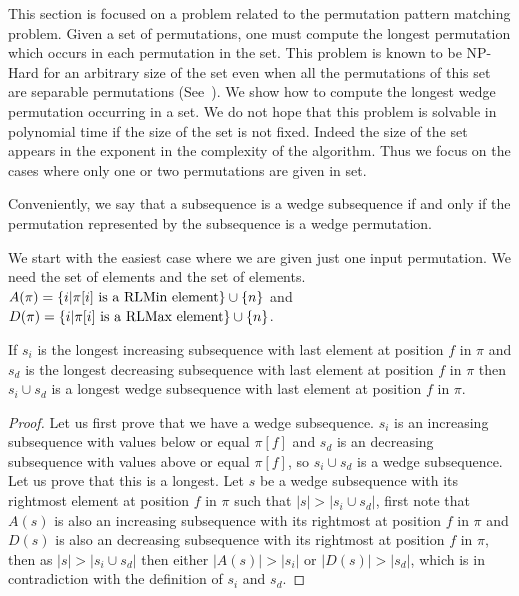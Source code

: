\documentclass[a4paper]{llncs}
\newcommand{\RLMin}{\text{RLMin}\xspace}
\newcommand{\RLMax}{\text{RLMax}\xspace}
\begin{document}
This section is focused on a problem related to the permutation pattern matching problem.
Given a set of permutations, one must compute the longest permutation
which occurs in each permutation in the set.
This problem is known to be NP-Hard for an arbitrary size of the set even
when all the permutations of this set are separable permutations (See~\cite{2007math......2109B}).
We show how to compute the longest wedge permutation
occurring in a set.
We do not hope that this problem is solvable in polynomial time
if the size of the set is not fixed.
Indeed the size of the set appears in the exponent
in the complexity of the algorithm.
Thus we focus on the cases where only one or two permutations are given in set.

Conveniently, we say that a subsequence is
a wedge subsequence if and only if the permutation represented by the subsequence
is a wedge permutation.

We start with the easiest case where we are given just one input permutation.
We need the set of \RLMax elements and the set of \RLMin elements.
$A(\pi) = \{i | \text{$\pi[i]$ is a \RLMin element} \} \cup \{n\}$ and
$D(\pi) = \{i | \text{$\pi[i]$ is a \RLMax element} \} \cup \{n\}$.\\


\begin{proposition}
\label{proposition:longestIncreasingSubsequence}
If $s_i$ is the longest increasing subsequence with last element at position $f$ in $\pi$
and $s_d$ is the longest decreasing subsequence with last element at position $f$ in $\pi$
then $s_i \cup s_d$ is a longest wedge subsequence with last element at position $f$ in $\pi$.
\end{proposition}

\begin{proof}
Let us first prove that we have a wedge subsequence.
$s_i$ is an increasing subsequence with values below or equal $\pi[f]$ and
$s_d$ is an decreasing subsequence with values above or equal $\pi[f]$,
so $s_i \cup s_d$ is a wedge subsequence.
Let us prove that this is a longest.
Let $s$ be a wedge subsequence with its rightmost element at position $f$ in $\pi$ such
that $|s|>|s_i \cup s_d|$,
first note that $A(s)$ is also an increasing subsequence with its rightmost  at position $f$ in $\pi$
and $D(s)$ is also an decreasing subsequence with its rightmost  at position $f$ in $\pi$,
then as $|s|>|s_i \cup s_d|$ then either $|A(s)| > |s_i|$ or $|D(s)| > |s_d|$,
which is in contradiction with the definition of $s_i$ and $s_d$.
\end{proof}
\end{document}
